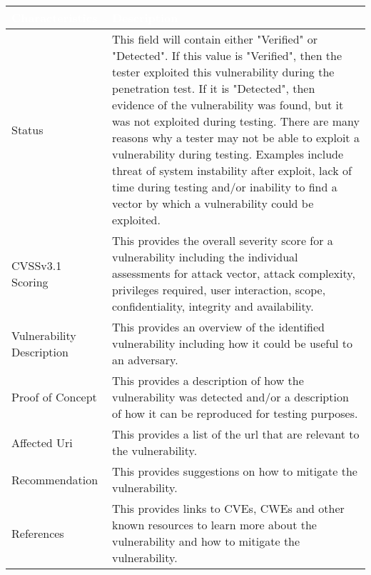 \documentclass{article}
\begin{document}
            \begin{center}
                \begin{longtable} {|p{9em}|p{31em}|}
                \hline 
                \large \cellcolor{tablecol} \textcolor{white}{\textbf{Characteristics}} & \large \cellcolor{tablecol} \textcolor{white}{\textbf{Description}}   \\    
                \hline
                \normalsize Status & \normalsize This field will contain either "Verified" or "Detected". If this value is "Verified", then the tester exploited this vulnerability during the penetration test. If it is "Detected",
                then evidence of the vulnerability was found, but it was not exploited during testing. There are many reasons why a tester may not be able to exploit a vulnerability
                during testing. Examples include threat of system instability after exploit, lack of time during testing and/or inability to find a vector by which a vulnerability could be exploited.  \\
                \hline
                \normalsize CVSSv3.1 Scoring  & \normalsize This provides the overall severity score for a vulnerability including the individual
                assessments for attack vector, attack complexity, privileges required, user interaction, scope, confidentiality, integrity and availability.  \\
                \hline
                \normalsize Vulnerability Description  & \normalsize This provides an overview of the identified vulnerability including how it could be useful to an adversary. \\
                \hline
                \normalsize Proof of Concept & \normalsize This provides a description of how the vulnerability was detected and/or a description of how it can be reproduced for testing purposes. \\
                \hline
                \normalsize Affected Uri  & \normalsize This provides a list of the url that are relevant to the vulnerability. \\
                \hline
                \normalsize Recommendation & \normalsize This provides suggestions on how to mitigate the vulnerability. \\
                \hline
                \normalsize References & \normalsize This provides links to CVEs, CWEs and other known resources to learn more about the vulnerability and how to mitigate the vulnerability. \\
                \hline
                \end{longtable}   
            \end{center}
            
\end{document}
